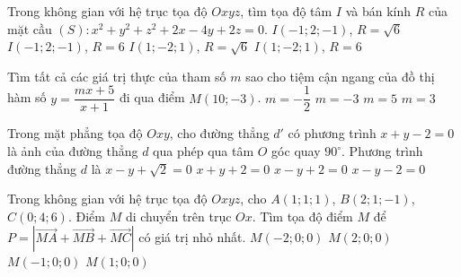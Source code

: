 \begin{ex}%
Trong không gian với hệ trục tọa độ $Oxyz$, tìm tọa độ tâm $I$ và bán kính $R$ của mặt cầu  $(S)\colon x^2+y^2+z^2+2x-4y+2z=0$.
\choice
{\True $I(-1;2;-1)$, $R=\sqrt 6$}
{$I(-1;2;-1)$, $R=6$}
{$I(1;-2;1)$, $R=\sqrt6$}
{$I(1;-2;1)$, $R=6$}
\end{ex}

\begin{ex}%
Tìm tất cả các giá trị thực của tham số $m$ sao cho tiệm cận ngang của đồ thị hàm số $y=\dfrac{mx+5}{x+1}$ đi qua điểm $M(10;-3)$.
\choice
{$m=-\dfrac{1}{2}$}
{\True $m=-3$}
{$m=5$}
{$m=3$}
\end{ex}

\begin{ex}%
Trong mặt phẳng tọa độ $Oxy$, cho đường thẳng $d'$ có phương trình $x+y-2=0$ là ảnh của đường thẳng $d$ qua phép qua tâm $O$ góc quay $90^\circ$. Phương trình đường thẳng $d$ là
\choice
{$x-y+\sqrt 2=0$}
{$x+y+2=0$}
{$x-y+2=0$}
{\True $x-y-2=0$}
\end{ex}

\begin{ex}%
Trong không gian với hệ trục tọa độ $Oxyz$, cho $A(1;1;1)$, $B(2;1;-1)$, $C(0;4;6)$. Điểm $M$ di chuyển trên trục $Ox$. Tìm tọa độ điểm $M$ để $P=\left|\vec{MA}+\vec{MB}+\vec{MC}\right|$ có giá trị nhỏ nhất.
\choice
{$M(-2;0;0)$}
{$M(2;0;0)$}
{$M(-1;0;0)$}
{\True $M(1;0;0)$}
\end{ex}

